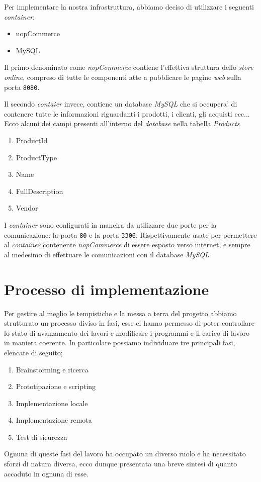 \documentclass[a4paper]{report}
\begin{document}
		Per implementare la nostra infrastruttura, abbiamo deciso di utilizzare i seguenti \emph{container}:
		\begin{itemize}
			\item nopCommerce
			\item MySQL
		\end{itemize}
		Il primo denominato come \emph{nopCommerce} contiene l'effettiva struttura dello \emph{store online}, compreso
		di tutte le componenti atte a pubblicare le pagine \emph{web} sulla porta \texttt{8080}.
		
		Il secondo \emph{contaier} invece, contiene un database \emph{MySQL} che si occupera' di contenere tutte le
		informazioni riguardanti i prodotti, i clienti, gli acquisti ecc... 
		\\Ecco alcuni dei campi presenti all'interno del \emph{database} nella tabella \emph{Products}
		\begin{enumerate}
			\item ProductId
			\item ProductType
			\item Name
			\item FullDescription
			\item Vendor
		\end{enumerate}

		I \emph{container} sono configurati in maneira da utilizzare due porte per la comunicazione: la porta
		\texttt{80} e la porta \texttt{3306}. Rispettivamente usate per permettere al \emph{container} contenente
		\emph{nopCommerce} di essere esposto verso internet, e sempre al medesimo di effettuare le comunicazioni con il database \emph{MySQL}.

\chapter{Processo di implementazione} \label{processo_di_implementazione}
	Per gestire al meglio le tempistiche e la messa a terra del progetto abbiamo strutturato un processo diviso in fasi,
	esse ci hanno permesso di poter controllare lo stato di avanzamento dei lavori e modificare i programmi e il carico
	di lavoro in maniera coerente. In particolare possiamo individuare tre principali fasi, elencate di seguito;
	\begin{enumerate}
		\item Brainstorming e ricerca
		\item Prototipazione e scripting
		\item Implementazione locale
		\item Implementazione remota
		\item Test di sicurezza
	\end{enumerate}
	Ognuna di queste fasi del lavoro ha occupato un diverso ruolo e ha necessitato sforzi di natura diversa, ecco dunque
	presentata una breve sintesi di quanto accaduto in ognuna di esse.
\end{document}
